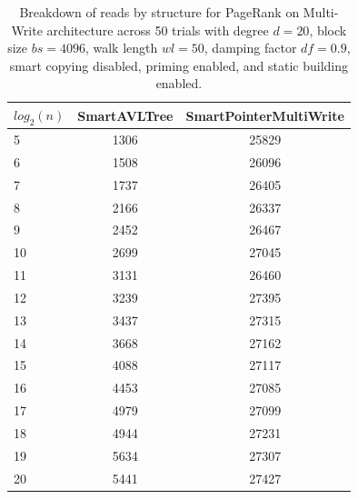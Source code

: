 \begin{table}[]
\centering
\begin{tabular}{|l|c|c|}
$log_2(n)$ & SmartAVLTree & SmartPointerMultiWrite \\ \hline
5 & 1306 & 25829 \\ \hline
6 & 1508 & 26096 \\ \hline
7 & 1737 & 26405 \\ \hline
8 & 2166 & 26337 \\ \hline
9 & 2452 & 26467 \\ \hline
10 & 2699 & 27045 \\ \hline
11 & 3131 & 26460 \\ \hline
12 & 3239 & 27395 \\ \hline
13 & 3437 & 27315 \\ \hline
14 & 3668 & 27162 \\ \hline
15 & 4088 & 27117 \\ \hline
16 & 4453 & 27085 \\ \hline
17 & 4979 & 27099 \\ \hline
18 & 4944 & 27231 \\ \hline
19 & 5634 & 27307 \\ \hline
20 & 5441 & 27427 \\ \hline
\end{tabular}
\caption{Breakdown of reads by structure for PageRank on Multi-Write architecture across 50 trials with degree $d=20$, block size $bs=4096$, walk length $wl=50$, damping factor $df=0.9$, smart copying disabled, priming enabled, and static building enabled.}
    \label{tab:reads_by_structure_pr_d20_bs4096_trials50_copiesfalse_primetrue_staticinsertiontrue_wl50_df0.9_ptmultiwrite_movetrue}
\end{table}

